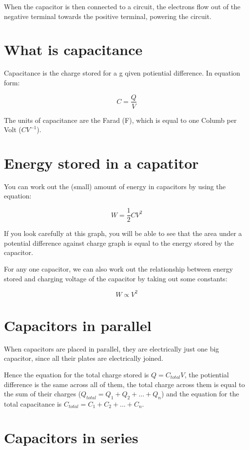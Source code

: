 \documentclass{article}
\begin{document}
When the capacitor is then connected to a circuit, the electrons flow out of the
negative terminal towards the positive terminal, powering the circuit.

\section*{What is capacitance}

Capacitance is the charge stored for a g qiven potiential difference. In
equation form:

\[
	C = \frac{Q}{V}
\]

The units of capacitance are the Farad (F), which is equal to one Columb per
Volt ($CV^{-1}$).

\section*{Energy stored in a capatitor}

You can work out the (small) amount of energy in capacitors by using the
equation:

\[
	W = \frac{1}{2}CV^2
\]

If you look carefully at this graph, you will be able to see that the area under
a potential difference against charge graph is equal to the energy stored by the
capacitor.

For any one capacitor, we can also work out the relationship between energy
stored and charging voltage of the capacitor by taking out some constants:

\[
	W \propto V^2
\]

\section*{Capacitors in parallel}

When capacitors are placed in parallel, they are electrically just one big
capacitor, since all their plates are electrically joined.

Hence the equation for the total charge stored is $Q = C_{total}V$, the
potiential difference is the same across all of them, the total charge across
them is equal to the sum of their charges ($Q_{total} = Q_1 + Q_2 + ... + Q_n$)
and the equation for the total capacitance is $C_{total} = C_1 + C_2 + ... +
C_n$.

\section*{Capacitors in series}
\end{document}
